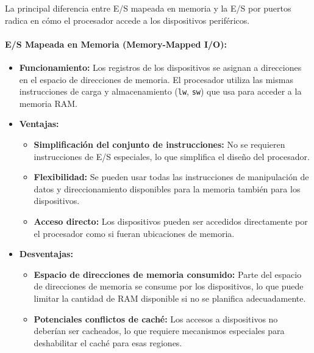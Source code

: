 \documentclass[12pt]{article}
\begin{document}
La principal diferencia entre E/S mapeada en memoria y la E/S por puertos radica en cómo el procesador accede a los dispositivos periféricos.

\paragraph{E/S Mapeada en Memoria (Memory-Mapped I/O):}
\begin{itemize}
    \item \textbf{Funcionamiento:} Los registros de los dispositivos se asignan a direcciones en el espacio de direcciones de memoria. El procesador utiliza las mismas instrucciones de carga y almacenamiento (\texttt{lw}, \texttt{sw}) que usa para acceder a la memoria RAM.
    \item \textbf{Ventajas:}
    \begin{itemize}
        \item \textbf{Simplificación del conjunto de instrucciones:} No se requieren instrucciones de E/S especiales, lo que simplifica el diseño del procesador.
        \item \textbf{Flexibilidad:} Se pueden usar todas las instrucciones de manipulación de datos y direccionamiento disponibles para la memoria también para los dispositivos.
        \item \textbf{Acceso directo:} Los dispositivos pueden ser accedidos directamente por el procesador como si fueran ubicaciones de memoria.
    \end{itemize}
    \item \textbf{Desventajas:}
    \begin{itemize}
        \item \textbf{Espacio de direcciones de memoria consumido:} Parte del espacio de direcciones de memoria se consume por los dispositivos, lo que puede limitar la cantidad de RAM disponible si no se planifica adecuadamente.
        \item \textbf{Potenciales conflictos de caché:} Los accesos a dispositivos no deberían ser cacheados, lo que requiere mecanismos especiales para deshabilitar el caché para esas regiones.
    \end{itemize}
\end{itemize}
\end{document}
